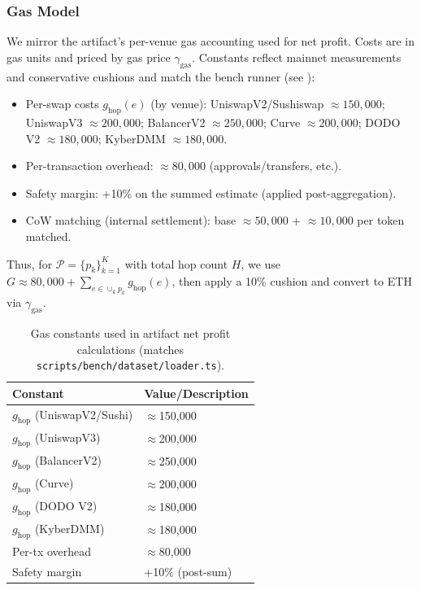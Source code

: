 \documentclass[11pt]{article}
\newcommand{\1}{\mathbf{1}}  %
\begin{document}
\subsubsection*{Gas Model}
We mirror the artifact's per-venue gas accounting used for net profit. Costs are in gas units and priced by gas price $\gamma_{\text{gas}}$. Constants reflect mainnet measurements and conservative cushions and match the bench runner (see \texttt{}):
\begin{itemize}[leftmargin=*]
  \item Per-swap costs $g_{\text{hop}}(e)$ (by venue): UniswapV2/Sushiswap $\approx 150{,}000$; UniswapV3 $\approx 200{,}000$; BalancerV2 $\approx 250{,}000$; Curve $\approx 200{,}000$; DODO V2 $\approx 180{,}000$; KyberDMM $\approx 180{,}000$.
  \item Per-transaction overhead: $\approx 80{,}000$ (approvals/transfers, etc.).
  \item Safety margin: +10\% on the summed estimate (applied post-aggregation).
  \item CoW matching (internal settlement): base $\approx 50{,}000$ + $\approx 10{,}000$ per token matched.
\end{itemize}
Thus, for $\mathcal{P}=\{p_k\}_{k=1}^K$ with total hop count $H$, we use $G \approx 80{,}000 + \sum_{e\in \cup_k p_k} g_{\text{hop}}(e)$, then apply a 10\% cushion and convert to ETH via $\gamma_{\text{gas}}$.

\begin{table}[t]
\centering\small
\begin{tabular}{ll}
\toprule
Constant & Value/Description \\ \midrule
$g_{\text{hop}}$ (UniswapV2/Sushi) & $\approx$150,000 \\
$g_{\text{hop}}$ (UniswapV3) & $\approx$200,000 \\
$g_{\text{hop}}$ (BalancerV2) & $\approx$250,000 \\
$g_{\text{hop}}$ (Curve) & $\approx$200,000 \\
$g_{\text{hop}}$ (DODO V2) & $\approx$180,000 \\
$g_{\text{hop}}$ (KyberDMM) & $\approx$180,000 \\
Per-tx overhead & $\approx$80,000 \\
Safety margin & +10\% (post-sum) \\
\bottomrule
\end{tabular}
\caption{Gas constants used in artifact net profit calculations (matches \texttt{scripts/bench/dataset/loader.ts}).}
\end{table}
\end{document}
